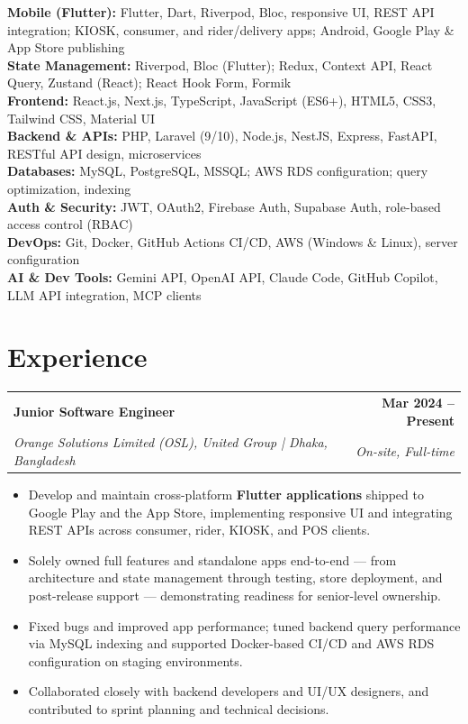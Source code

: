 \documentclass[a4paper,10pt]{article}
\makeatletter
\newcommand{\medgap}{\vspace{3pt}}
\newcommand{\entry}[4]{
  \begin{tabularx}{\textwidth}{@{}X r@{}}
    \textbf{#1} & \textbf{#2} \\
    \textit{#3} & \textit{#4} \\
  \end{tabularx}
}
\makeatother
\begin{document}
\noindent
\textbf{Mobile (Flutter):} Flutter, Dart, Riverpod, Bloc, responsive UI, REST API integration; KIOSK, consumer, and rider/delivery apps; Android, Google Play \& App Store publishing \\[3pt]
\textbf{State Management:} Riverpod, Bloc (Flutter); Redux, Context API, React Query, Zustand (React); React Hook Form, Formik \\[3pt]
\textbf{Frontend:} React.js, Next.js, TypeScript, JavaScript (ES6+), HTML5, CSS3, Tailwind CSS, Material UI \\[3pt]
\textbf{Backend \& APIs:} PHP, Laravel (9/10), Node.js, NestJS, Express, FastAPI, RESTful API design, microservices \\[3pt]
\textbf{Databases:} MySQL, PostgreSQL, MSSQL; AWS RDS configuration; query optimization, indexing \\[3pt]
\textbf{Auth \& Security:} JWT, OAuth2, Firebase Auth, Supabase Auth, role-based access control (RBAC) \\[3pt]
\textbf{DevOps:} Git, Docker, GitHub Actions CI/CD, AWS (Windows \& Linux), server configuration \\[3pt]
\textbf{AI \& Dev Tools:} Gemini API, OpenAI API, Claude Code, GitHub Copilot, LLM API integration, MCP clients

\medgap

\section*{Experience}

\entry{Junior Software Engineer}{Mar 2024 -- Present}{Orange Solutions Limited (OSL), United Group | Dhaka, Bangladesh}{On-site, Full-time}
\begin{itemize}
  \item Develop and maintain cross-platform \textbf{Flutter applications} shipped to Google Play and the App Store, implementing responsive UI and integrating REST APIs across consumer, rider, KIOSK, and POS clients.
  \item Solely owned full features and standalone apps end-to-end --- from architecture and state management through testing, store deployment, and post-release support --- demonstrating readiness for senior-level ownership.
  \item Fixed bugs and improved app performance; tuned backend query performance via MySQL indexing and supported Docker-based CI/CD and AWS RDS configuration on staging environments.
  \item Collaborated closely with backend developers and UI/UX designers, and contributed to sprint planning and technical decisions.
\end{itemize}
\end{document}
